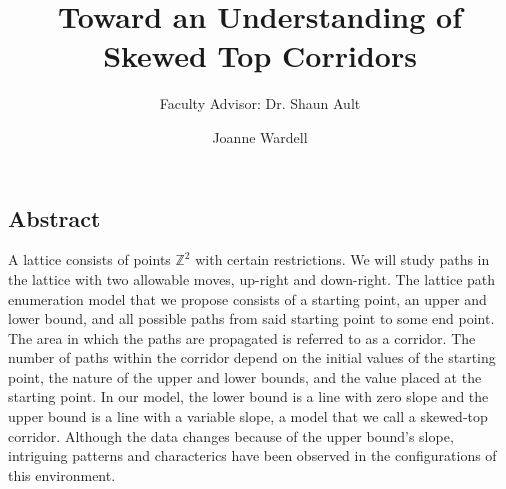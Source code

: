 \documentclass{article}
\title{Toward an Understanding of Skewed Top Corridors}
\author{Faculty Advisor: Dr. Shaun Ault}
\date{Joanne Wardell}
\newcommand*{\set}[1]{\mathbb{#1}}
\newcommand\tab[1][1cm]{\hspace*{#1}}
\begin{document}
\maketitle
\begin{center}
	\subsection*{Abstract}
\end{center}


\tab A lattice consists of points $\set{Z}^{2}$ with certain restrictions. We will study paths in the lattice with two allowable moves, up-right and down-right. The lattice path enumeration model that we propose 
consists of a starting point, an upper and lower bound, and all possible paths from said starting point to some end point. The area in which the paths are propagated is referred to as a corridor. The number of paths 
within the corridor depend on the initial values of the starting point, the nature of the upper and lower bounds, and the value placed at the starting point. In our model, the lower bound is a line with zero slope 
and the upper bound is a line with a variable slope, a model that we call a skewed-top corridor. Although the data changes because of the upper bound's slope, intriguing patterns and characterics have been observed 
in the configurations of this environment.
\end{document}
